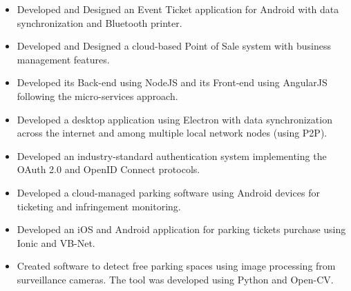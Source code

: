 \documentclass[10pt,a4paper,ragged2e]{altacv}
\begin{document}
\divider

\begin{itemize}
\item Developed and Designed an Event Ticket application for Android with data synchronization and Bluetooth printer.
\item Developed and Designed a cloud-based Point of Sale system with business management features.
\item Developed its Back-end using NodeJS and its Front-end using AngularJS following the micro-services approach.
\item Developed a desktop application using Electron with data synchronization across the internet and among multiple local network nodes (using P2P).
\item Developed an industry-standard authentication system implementing the OAuth 2.0 and OpenID Connect protocols.
\end{itemize}

\divider

\begin{itemize}
\item Developed a cloud-managed parking software using Android devices for ticketing and infringement monitoring.  
\item Developed an iOS and Android application for parking tickets purchase using Ionic and VB-Net.
\item Created software to detect free parking spaces using image processing from surveillance cameras. The tool was developed using Python and Open-CV.
\end{itemize}

\clearpage


\nocite{*}



\printbibliography[heading=pubtype,title={\printinfo{\faFileTextO}{Journal Articles}}, type=article]

\divider

\printbibliography[heading=pubtype,title={\printinfo{\faGroup}{Conference Proceedings}},type=inproceedings]
% 
\end{document}
